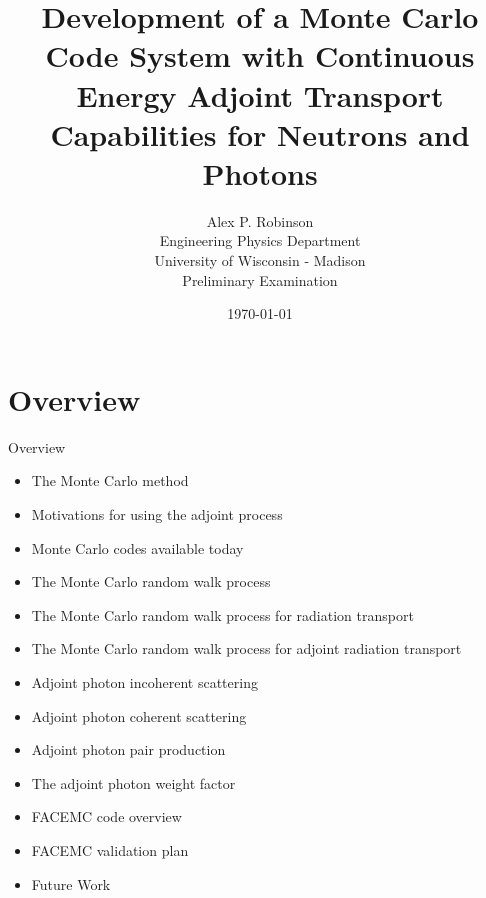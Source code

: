 \documentclass{beamer}
\author{Alex P. Robinson
    \\ Engineering Physics Department
    \\ University of Wisconsin - Madison
    \\ Preliminary Examination
}
\date{\today}
\title{Development of a Monte Carlo Code System with Continuous Energy Adjoint Transport Capabilities for Neutrons and Photons}
\begin{document}
\maketitle
\section{Overview}
\begin{frame}{Overview}

\begin{itemize}
  \item The Monte Carlo method
  \item Motivations for using the adjoint process
  \item Monte Carlo codes available today
  \item The Monte Carlo random walk process
  \item The Monte Carlo random walk process for radiation transport
  \item The Monte Carlo random walk process for adjoint radiation transport
  \item Adjoint photon incoherent scattering
  \item Adjoint photon coherent scattering
  \item Adjoint photon pair production
  \item The adjoint photon weight factor
  \item FACEMC code overview
  \item FACEMC validation plan
  \item Future Work
\end{itemize}

\end{frame}

\end{document}
